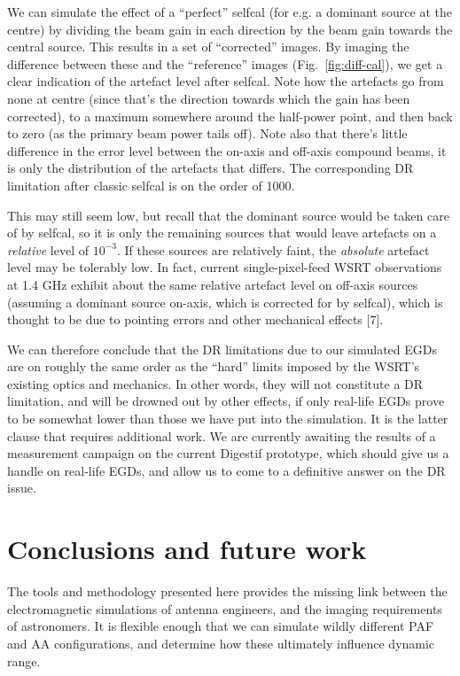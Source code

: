 \documentclass{aps2010} \special{papersize=8.5in,11in}
\begin{document}
We can simulate the effect of a ``perfect'' selfcal (for e.g. a dominant source at the centre) by dividing the beam gain in each direction by the beam gain towards the central source. This results in a set of ``corrected'' images. By imaging the difference between these and the ``reference'' images (Fig.~\ref{fig:diff-cal}), we get a clear indication of the artefact level after selfcal. Note how the artefacts go from none at centre (since that's the direction towards which the gain has been corrected), to a maximum somewhere around the half-power point, and then back to zero (as the primary beam power tails off). Note also that there's little difference in the error level between the on-axis and off-axis compound beams, it is only the distribution of the artefacts that differs. The corresponding DR limitation after classic selfcal is on the order of 1000.

This may still seem low, but recall that the dominant source would be taken care of by selfcal, so it is only the remaining sources that would leave artefacts on a \emph{relative} level of $10^{-3}$. If these sources are relatively faint, the \emph{absolute} artefact level may be tolerably low. In fact, current single-pixel-feed WSRT observations at 1.4 GHz exhibit about the same relative artefact level on off-axis sources (assuming a dominant source on-axis, which is corrected for by selfcal), which is thought to be due to pointing errors and other mechanical effects [7].

We can therefore conclude that the DR limitations due to our simulated EGDs are on roughly the same order as the ``hard'' limits imposed by the 
WSRT's existing optics and mechanics. In other words, they will not constitute a DR limitation, and will be drowned out by other effects, if only real-life EGDs prove to be somewhat lower than those we have put into the simulation. It is the latter clause that requires additional work. We are currently awaiting the results of a measurement campaign on the current Digestif prototype, which should give us a handle on real-life EGDs, and allow us to come to a  definitive answer on the DR issue.

\section{Conclusions and future work}

The tools and methodology presented here provides the missing link between the electromagnetic simulations of antenna engineers, and the 
imaging requirements of astronomers. It is flexible enough that we can simulate wildly different PAF and AA configurations, and determine how these ultimately influence dynamic range.
\end{document}
